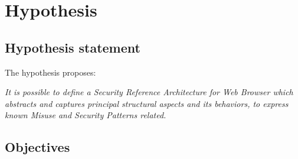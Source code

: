 


\section{Hypothesis}
	\subsection{Hypothesis statement}
	The hypothesis proposes:
	\begin{center}
		\textit{It is possible to define a Security Reference Architecture for Web Browser which abstracts and captures principal structural aspects and its behaviors, to express known Misuse and Security Patterns related.}
	\end{center}

	\subsection{Objectives}
